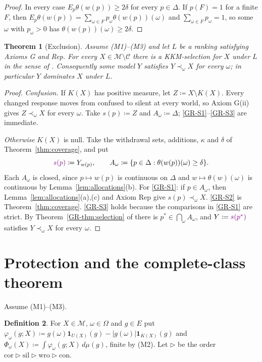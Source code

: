 \documentclass[11pt]{article}
\newcommand{\chg}[1]{{\color{red}#1}}
\newcommand{\chgb}[1]{{\color{violet}#1}}
\newtheorem{theorem}{Theorem}[section]
\theoremstyle{definition}
\newtheorem{definition}[theorem]{Definition}
\theoremstyle{remark}
\newcommand{\M}{\mathcal M}
\newcommand{\C}{\mathcal C}
\newcommand{\one}{\mathbf 1}
\newcommand{\cor}{\mathrm{cor}}
\newcommand{\sil}{\mathrm{sil}}
\newcommand{\wro}{\mathrm{wro}}
\newcommand{\con}{\mathrm{con}}
\begin{document}
\begin{proof}
In every case $E_p\theta(w(p))\ge2\delta$ for every $p\in\Delta$. If $p(F)=1$ for a finite $F$, then $E_p\theta(w(p))=\sum_{\omega\in F}p_\omega\theta(w(p))(\omega)$ and $\sum_{\omega\in F}p_\omega=1$, so some $\omega$ with $p_\omega>0$ has $\theta(w(p))(\omega)\ge2\delta$.
\end{proof}

\begin{theorem}[Exclusion]\label{thm:exclusion}
Assume (M1)--(M3) and let $L$ be a ranking satisfying Axioms G and Rep. For every $X\in\M\setminus\C$ there is a \chgb{KKM-selection} for $X$ under $L$ in the sense of \cite[Definition~\ref{GR-def:selection}]{KonekGR}. Consequently some model $Y$ satisfies $Y\prec_\omega X$ for every $\omega$; in particular $Y$ dominates $X$ under $L$.
\end{theorem}
\begin{proof}
\emph{Confusion.} If $K(X)$ has positive measure, let $Z\coloneqq X\setminus K(X)$. Every changed response moves from confused to silent at every world, so Axiom G(ii) gives $Z\prec_\omega X$ for every $\omega$. Take \chgb{$s(p)\coloneqq Z$} and $A_\omega\coloneqq\Delta$; \ref{GR-S1}--\ref{GR-S3} are immediate.

\emph{Otherwise} $K(X)$ is null. Take the withdrawal sets, additions, \chgb{$\kappa$} and $\delta$ of Theorem~\ref{thm:coverage}, and put
\[
\chgb{s(p)}\coloneqq Y_{w(p)},\qquad A_\omega\coloneqq\{p\in\Delta:\theta(w(p))(\omega)\ge\delta\}.
\]
Each $A_\omega$ is closed, since $p\mapsto w(p)$ is continuous on $\Delta$ and $w\mapsto\theta(w)(\omega)$ is continuous by Lemma~\ref{lem:allocations}(b). For \ref{GR-S1}: if $p\in A_\omega$, then Lemma~\ref{lem:allocations}(a),(c) and Axiom Rep give \chgb{$s(p)$}$\prec_\omega X$. \ref{GR-S2} is Theorem~\ref{thm:coverage}. \chg{\ref{GR-S3} holds because the comparisons in \ref{GR-S1} are strict.} By Theorem~\ref{GR-thm:selection} of \cite{KonekGR} there is $p^*\in\bigcap_\omega A_\omega$, and $Y\coloneqq\chgb{s(p^*)}$ satisfies $Y\prec_\omega X$ for every $\omega$.
\end{proof}

\section{Protection and the complete-class theorem}\label{sec:protection}

Assume (M1)--(M3).

\begin{definition}\label{def:Phi}
For $X\in\M$, $\omega\in\Omega$ and $g\in E$ put $\varphi_\omega(g;X)\coloneqq g(\omega)\one_{U(X)}(g)-|g(\omega)|\one_{K(X)}(g)$ and $\Phi_\omega(X)\coloneqq\int\varphi_\omega(g;X)\,d\mu(g)$, finite by (M2). Let $\rhd$ be the order $\cor\rhd\sil\rhd\wro\rhd\con$.
\end{definition}
\end{document}

